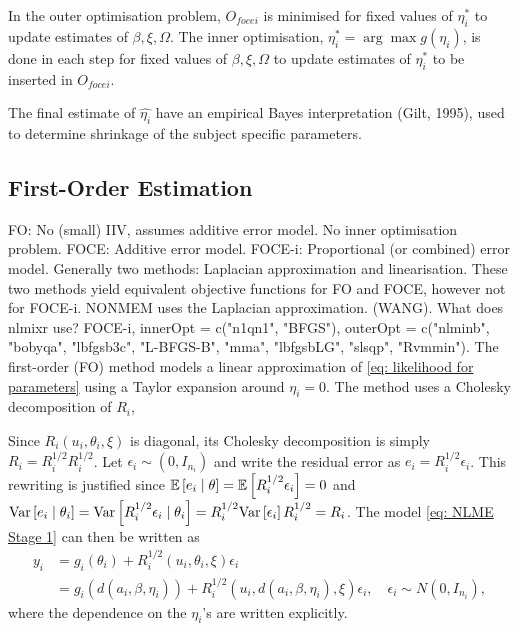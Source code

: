 In the outer optimisation problem, $O_{focei}$ is minimised for fixed values of $\eta_i^\ast$ to update estimates of $\beta,\xi,\Omega$. The inner optimisation, $\eta_i^\ast = \arg \max g(\eta_i)$, is done in each step for fixed values of $\beta,\xi,\Omega$ to update estimates of $\eta_i^\ast$ to be inserted in $O_{focei}$. 

The final estimate of $\hat{\eta_i}$ have an empirical Bayes interpretation (Gilt, 1995), used to determine shrinkage of the subject specific parameters. 


\subsection{First-Order Estimation}
FO: No (small) IIV, assumes additive error model. No inner optimisation problem. FOCE: Additive error model. FOCE-i: Proportional (or combined) error model. Generally two methods: Laplacian approximation and linearisation. These two methods yield equivalent objective functions for FO and FOCE, however not for FOCE-i. NONMEM uses the Laplacian approximation. (WANG). What does nlmixr use? FOCE-i, innerOpt = c("n1qn1", "BFGS"), outerOpt = c("nlminb", "bobyqa", "lbfgsb3c", "L-BFGS-B", "mma", "lbfgsbLG", "slsqp",
"Rvmmin").
The first-order (FO) method models a linear approximation of \eqref{eq: likelihood for parameters} using a Taylor expansion around $\eta_i=0$. The method uses a Cholesky decomposition of $R_i$, 

Since $R_i(u_i,\theta_i,\xi)$ is diagonal, its Cholesky decomposition is simply $R_i=R_i^{1/2}R_i^{1/2}$. Let $\epsilon_i \sim (0,I_{n_i})$ and write the residual error as $e_i=R_i^{1/2}\epsilon_i$. This rewriting is justified since $\mathbb{E}\left[{e_i \mid \theta}\right]=\mathbb{E}\left[{R_i^{1/2}\epsilon_i}\right]=0$ and $\text{Var}\left[{e_i \mid \theta_i}\right]=\text{Var}\left[{R_i^{1/2}\epsilon_i \mid \theta_i }\right]=R_i^{1/2}\text{Var}\left[{\epsilon_i}\right]R_i^{1/2}=R_i$. The model \eqref{eq: NLME Stage 1} can then be written as 
\begin{align*}
    y_i &= g_i(\theta_i) + R_i^{1/2}(u_i,\theta_i,\xi)\epsilon_i \\
    &= g_i(d(a_i,\beta,\eta_i)) + R_i^{1/2}(u_i,d(a_i,\beta,\eta_i),\xi)\epsilon_i, \quad \epsilon_i \sim N(0,I_{n_i}),
\end{align*}
where the dependence on the $\eta_i$'s are written explicitly.

